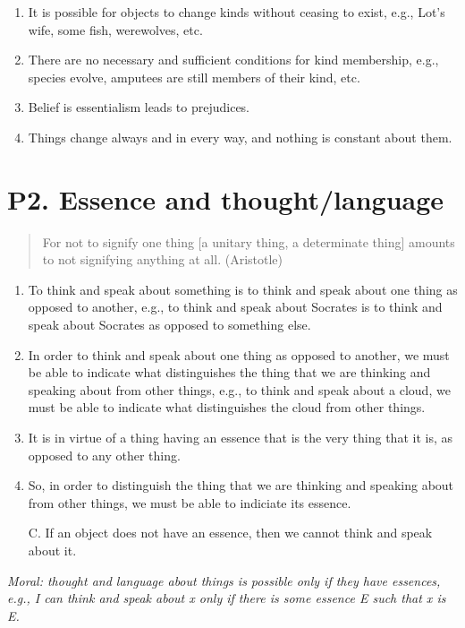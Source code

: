 \documentclass[article,oneside]{memoir}
\begin{document}
\begin{enumerate}
\item It is possible for objects to change kinds without ceasing to exist, e.g., Lot's wife, some fish, werewolves, etc.
\item There are no necessary and sufficient conditions for kind membership, e.g., species evolve, amputees are still members of their kind, etc.
\item Belief is essentialism leads to prejudices. 
\item Things change always and in every way, and nothing is constant about them.
\end{enumerate}

\section{P2. Essence and thought/language}
\begin{quotation}
For not to signify one thing [a unitary thing, a determinate thing] amounts to not signifying anything at all. (Aristotle)
\end{quotation}


\begin{enumerate}
\item To think and speak about something is to think and speak about one thing as opposed to another, e.g., to think and speak about Socrates is to think and speak about Socrates as opposed to something else. 
\item  In order to think and speak about one thing as opposed to another, we must be able to indicate what distinguishes the thing that we are thinking and speaking about from other things, e.g., to think and speak about a cloud, we must be able to indicate what distinguishes the cloud from other things.  
\item It is in virtue of a thing having an essence that is the very thing that it is, as opposed to any other thing.
\item So, in order to distinguish the thing that we are thinking and speaking about from other things, we must be able to indiciate its essence. 
\item[C.] If an object does not have an essence, then we cannot think and speak about it. 
\end{enumerate}


\noindent \emph{Moral: thought and language about things is possible only if they have essences, e.g., I can think and speak about x only if there is some essence E such that x is E.}
\end{document}
